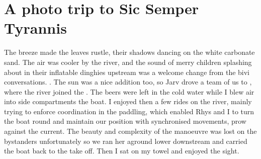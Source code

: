 \section{A photo trip to Sic Semper Tyrannis}
    \begin{marginfigure}
    \end{marginfigure}

    The breeze made the leaves rustle, their shadows dancing on the white carbonate sand. The air was cooler by the  river, and the sound of merry children splashing about in their inflatable dinghies upstream was a welcome change from the bivi conversations.
    . The sun was a nice addition too, so Jarv drove a team of us to , where the  river joined the . The beers were left in the cold water while I blew air into side compartments the boat.
    I enjoyed then a few rides on the river, mainly trying to enforce coordination in the paddling, which enabled Rhys and I to turn the boat round and maintain our position with synchronised movements, prow against the current. The beauty and complexity of the manoeuvre was lost on the bystanders unfortunately so we ran her aground lower downstream and carried the boat back to the take off. Then I sat on my towel and enjoyed the sight.

